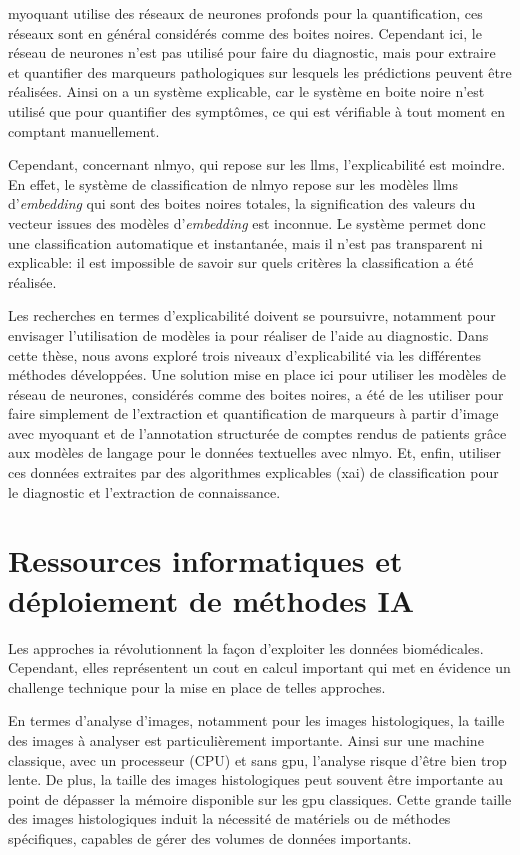 \gls{myoquant} utilise des réseaux de neurones profonds pour la quantification, ces réseaux sont en général considérés comme des boites noires. Cependant ici, le réseau de neurones n'est pas utilisé pour faire du diagnostic, mais pour extraire et quantifier des marqueurs pathologiques sur lesquels les prédictions peuvent être réalisées. Ainsi on a un système explicable, car le système en boite noire n'est utilisé que pour quantifier des symptômes, ce qui est vérifiable à tout moment en comptant manuellement.

Cependant, concernant \gls{nlmyo}, qui repose sur les \gls{llms}, l'explicabilité est moindre. En effet, le système de classification de \gls{nlmyo} repose sur les modèles \gls{llms} d'\textit{embedding} qui sont des boites noires totales, la signification des valeurs du vecteur issues des modèles d'\textit{embedding} est inconnue. Le système permet donc une classification automatique et instantanée, mais il n'est pas transparent ni explicable: il est impossible de savoir sur quels critères la classification a été réalisée.

Les recherches en termes d'explicabilité doivent se poursuivre, notamment pour envisager l'utilisation de modèles \gls{ia} pour réaliser de l'aide au diagnostic. Dans cette thèse, nous avons exploré trois niveaux d'explicabilité via les différentes méthodes développées. Une solution mise en place ici pour utiliser les modèles de réseau de neurones, considérés comme des boites noires, a été de les utiliser pour faire simplement de l'extraction et quantification de marqueurs à partir d'image avec \gls{myoquant} et de l'annotation structurée de comptes rendus de patients grâce aux modèles de langage pour le données textuelles avec \gls{nlmyo}. Et, enfin, utiliser ces données extraites par des algorithmes explicables (\gls{xai}) de classification pour le diagnostic et l'extraction de connaissance.

\section{Ressources informatiques et déploiement de méthodes IA}
Les approches \gls{ia} révolutionnent la façon d'exploiter les données biomédicales. Cependant, elles représentent un cout en calcul important qui met en évidence un challenge technique pour la mise en place de telles approches.

En termes d'analyse d'images, notamment pour les images histologiques, la taille des images à analyser est particulièrement importante. Ainsi sur une machine classique, avec un processeur (CPU) et sans \gls{gpu}, l'analyse risque d'être bien trop lente. De plus, la taille des images histologiques peut souvent être importante au point de dépasser la mémoire disponible sur les \gls{gpu} classiques. Cette grande taille des images histologiques induit la nécessité de matériels ou de méthodes spécifiques, capables de gérer des volumes de données importants.


